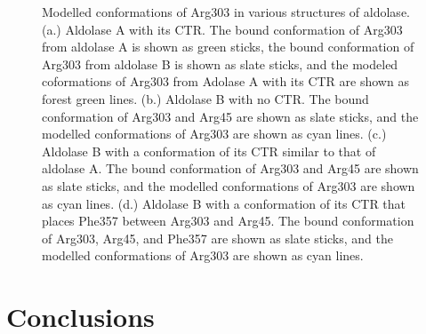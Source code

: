 \documentclass[11pt,a4paper]{article}
\begin{document}
\begin{figure}
\begin{center}
{                }
                \caption{
		Modelled conformations of Arg303 in various structures of aldolase. (a.)  Aldolase A with its CTR.  The bound
		conformation of Arg303 from aldolase A is shown as green sticks, the bound conformation of Arg303 from aldolase
		B is shown as slate sticks, and the modeled coformations of Arg303 from Adolase A with its CTR are shown as forest green
		lines. (b.)  Aldolase B with no CTR.  The bound conformation of Arg303 and Arg45 are shown as slate sticks, and the modelled
		conformations of Arg303 are shown as cyan lines.  (c.)  Aldolase B with a conformation of its CTR similar to that of aldolase
		A.  The bound conformation of Arg303 and Arg45 are shown as slate sticks, and the modelled conformations of Arg303 are shown as cyan lines.
		(d.) Aldolase B with a conformation of its CTR that places Phe357 between Arg303 and Arg45.  The bound conformation of Arg303, Arg45, and 
		Phe357 are shown as slate sticks, and the modelled conformations of Arg303 are shown as cyan lines.
                }
                \label{CTR}
        \end{center}
\end{figure}
	

\section{Conclusions}

	
\end{document}
